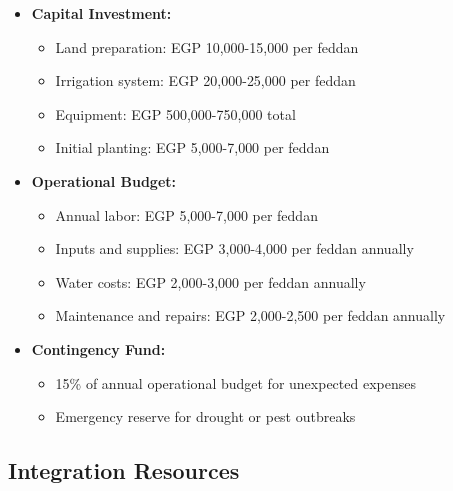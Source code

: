 \begin{itemize}
    \item \textbf{Capital Investment:}
    \begin{itemize}
        \item Land preparation: EGP 10,000-15,000 per feddan
        \item Irrigation system: EGP 20,000-25,000 per feddan
        \item Equipment: EGP 500,000-750,000 total
        \item Initial planting: EGP 5,000-7,000 per feddan
    \end{itemize}
    \item \textbf{Operational Budget:}
    \begin{itemize}
        \item Annual labor: EGP 5,000-7,000 per feddan
        \item Inputs and supplies: EGP 3,000-4,000 per feddan annually
        \item Water costs: EGP 2,000-3,000 per feddan annually
        \item Maintenance and repairs: EGP 2,000-2,500 per feddan annually
    \end{itemize}
    \item \textbf{Contingency Fund:}
    \begin{itemize}
        \item 15\% of annual operational budget for unexpected expenses
        \item Emergency reserve for drought or pest outbreaks
    \end{itemize}
\end{itemize}

\subsection{Integration Resources}

